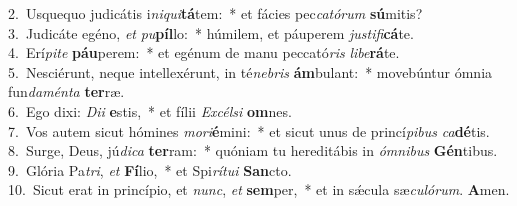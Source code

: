 {2.~}Usquequo judicátis i\textit{ni}\textit{qui}\textbf{tá}tem:~* et fácies pec\textit{ca}\textit{tó}\textit{rum} \textbf{sú}mitis?\\
{3.~}Judicáte egéno, \textit{et} \textit{pu}\textbf{píl}lo:~* húmilem, et páuperem \textit{ju}\textit{sti}\textit{fi}\textbf{cá}te.\\
{4.~}Erí\textit{pi}\textit{te} \textbf{páu}perem:~* et egénum de manu peccató\textit{ris} \textit{li}\textit{be}\textbf{rá}te.\\
{5.~}Nesciérunt, neque intellexérunt, in té\textit{ne}\textit{bris} \textbf{ám}bulant:~* movebúntur ómnia fun\textit{da}\textit{mén}\textit{ta} \textbf{ter}ræ.\\
{6.~}Ego dixi: \textit{Di}\textit{i} \textbf{e}stis,~* et fílii \textit{Ex}\textit{cél}\textit{si} \textbf{om}nes.\\
{7.~}Vos autem sicut hómines \textit{mo}\textit{ri}\textbf{é}mini:~* et sicut unus de princí\textit{pi}\textit{bus} \textit{ca}\textbf{dé}tis.\\
{8.~}Surge, Deus, jú\textit{di}\textit{ca} \textbf{ter}ram:~* quóniam tu hereditábis in \textit{óm}\textit{ni}\textit{bus} \textbf{Gén}tibus.\\
{9.~}Glória Pa\textit{tri}, \textit{et} \textbf{Fí}lio,~* et Spi\textit{rí}\textit{tu}\textit{i} \textbf{San}cto.\\
{10.~}Sicut erat in princípio, et \textit{nunc}, \textit{et} \textbf{sem}per,~* et in sǽcula sæ\textit{cu}\textit{ló}\textit{rum}. \textbf{A}men.\\
